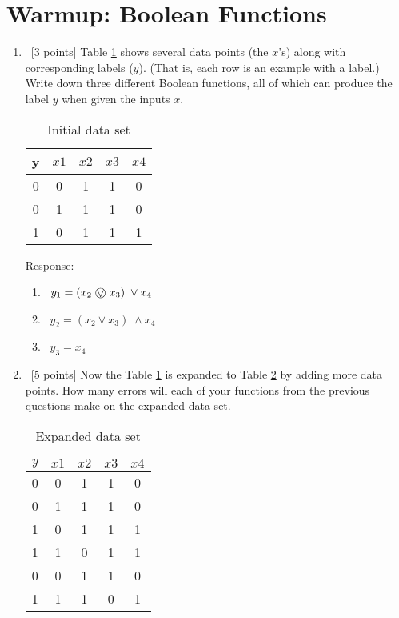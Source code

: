 \section{Warmup: Boolean Functions}
\label{sec:boolean-functions}

\begin{enumerate}
\item ~[3 points] Table \ref{tab:boolean-function-data-1} shows
  several data points (the $x$'s) along with corresponding labels
  ($y$). (That is, each row is an example with a label.) Write down
  three different Boolean functions, all of which can produce the
  label $y$ when given the inputs $x$.

  \begin{table}[h]
    \centering
    \begin{tabular}{ccccc}
      \toprule
      y & $x1$ & $x2$ & $x3$ & $x4$ \\
      \midrule
      0 & 0    & 1    & 1    & 0    \\
      0 & 1    & 1    & 1    & 0    \\
      1 & 0    & 1    & 1    & 1    \\
      \bottomrule
    \end{tabular}
    \caption{Initial data set}
    \label{tab:boolean-function-data-1}
  \end{table}
  
  Response:
  \begin{enumerate}
  	\item ~$y_1 = (x_2 \xor x_3) \; \lor x_4$
  	\item ~$y_2 = (x_2 \lor x_3) \; \land x_4$
  	\item ~$y_3 = x_4$
  \end{enumerate}
  
  
\item ~[5 points] Now the Table \ref{tab:boolean-function-data-1} is
  expanded to Table \ref{tab:boolean-function-data-2} by adding more
  data points. How many errors will each of your functions from the
  previous questions make on the expanded data set.

  \begin{table}[h]
    \centering
    \begin{tabular}{ccccc}
      \toprule
      $y$ & $x1$ & $x2$ & $x3$ & $x4$ \\
      \midrule
      0 & 0    & 1    & 1    & 0    \\
      0 & 1    & 1    & 1    & 0    \\
      1 & 0    & 1    & 1    & 1    \\
      1 & 1    & 0    & 1    & 1    \\
      0 & 0    & 1    & 1    & 0    \\
      1 & 1    & 1    & 0    & 1    \\
      \bottomrule
    \end{tabular}
    \caption{Expanded data set}
    \label{tab:boolean-function-data-2}
  \end{table}
  

\end{enumerate}
